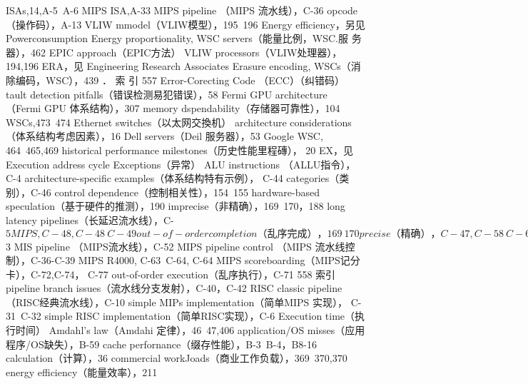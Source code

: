 ISAs,14,A-5~A-6
MIPS ISA,A-33
MIPS pipeline （MIPS 流水线），C-36
opcode（操作码），A-13
VLIW mmodel（VLIW模型），195~196
Energy efficiency，另见 Powerconsumption
Energy proportionality, WSC servers（能量比例，WSC.服
务器），462
EPIC approach（EPIC方法）
VLIW processors（VLIW处理器），194,196
ERA，见 Engineering Research Associates
Erasure encoding, WSCs（消除编码，WSC），439
．
索
引
557
Error-Corecting Code （ECC）（纠错码）
tault detection pitfalls（错误检测易犯错误），58
Fermi GPU architecture （Fermi GPU 体系结构），307
memory dspendability（存储器可靠性），104
WSCs,473~474
Ethernet switches（以太网交換机）
architecture considerations（体系结构考虑因素），16
Dell servers（Deil 服务器），53
Google WSC, 464~465,469
historical performance milestones（历史性能里程磚），
20
EX，见 Execution address cycle
Exceptions（异常）
ALU instructions （ALLU指令），C-4
architecture-specific examples（体系结构特有示例），
C-44
categories（类别），C-46
control dependence（控制相关性），154~155
hardware-based speculation（基于硬件的推测），190
imprecise（非精确），169~170，188
long latency pipelines（长延迟流水线），C-$5
MIPS,C-48,C-48~C-49
out-of-order completion（乱序完成），169~170
precise（精确），C-47, C-58~C-60
return address buffer（返回地址缓冲区），207
ROB instructions （ROB 指令），190
speculative execution（推测执行），222
stopping/restarting（停止/重新启动），C-46~C47
types and requirements（类型与需求），C-43~C-46
Execute step（执行步骤）
instruction steps（指令步骤），174
ROB instruction （ROB 指令），186
Execution address cycle （EX）（执行地址周期）
basic MIPS pipeline（基本MIPS流水线），C-36
data hazards requiring stalls（需要停顿的数据冒险），
C-21
data hazard stall minimization（数据冒险停顿最小化），
C-17
exception stopping/restarting（异常住/重新启动），
C-46~C-47
hazards and forwarding（冒险与转发），C-56~C-57
MIPS FP operations, basic considerations （MIPS 浮点运
算，基本考虑事项），C-51~C-$3
MIS pipeline （MIPS流水线），C-52
MIPS pipeline control （MIPS 流水线控制），C-36-C-39
MIPS R4000, C-63~C-64, C-64
MIPS scoreboarding（MIPS记分卡），C-72,C-74，
C-77
out-of-order execution（乱序执行），C-71
558
索引
pipeline branch issues（流水线分支发射），C-40，C-42
RISC classic pipeline （RISC经典流水线），C-10
simple MIPs implementation（简单MIPS 实现），
C-31~C-32
simple RISC implementation（简单RISC实现），C-6
Execution time（执行时间）
Amdahl's law（Amdahi 定律），46~47,406
application/OS misses（应用程序/OS缺失），B-59
cache perfornance（缀存性能），B-3~B-4，B8-16
calculation（计算），36
commercial workJoads（商业工作负载），369~370,370
energy efficiency（能量效率），211
